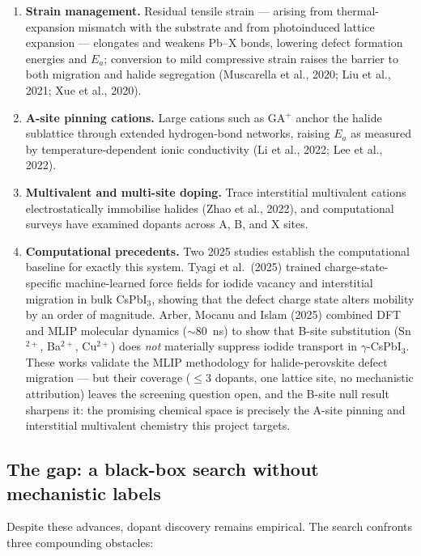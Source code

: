 \documentclass[11pt,a4paper]{article}
\begin{document}
\begin{enumerate}[leftmargin=1.5em]
\item \textbf{Strain management.} Residual tensile strain --- arising from
thermal-expansion mismatch with the substrate and from photoinduced lattice expansion
--- elongates and weakens Pb--X bonds, lowering defect formation energies and $E_a$;
conversion to mild compressive strain raises the barrier to both migration and halide
segregation (Muscarella et al., 2020; Liu et al., 2021; Xue et al., 2020).

\item \textbf{A-site pinning cations.} Large cations such as GA$^+$ anchor the halide
sublattice through extended hydrogen-bond networks, raising $E_a$ as measured by
temperature-dependent ionic conductivity (Li et al., 2022; Lee et al., 2022).

\item \textbf{Multivalent and multi-site doping.} Trace interstitial multivalent
cations electrostatically immobilise halides (Zhao et al., 2022), and computational
surveys have examined dopants across A, B, and X sites.

\item \textbf{Computational precedents.} Two 2025 studies establish the computational
baseline for exactly this system. Tyagi et al.\ (2025) trained charge-state-specific
machine-learned force fields for iodide vacancy and interstitial migration in bulk
CsPbI$_3$, showing that the defect charge state alters mobility by an order of
magnitude. Arber, Mocanu and Islam (2025) combined DFT and MLIP molecular dynamics
($\sim$80~ns) to show that B-site substitution (Sn$^{2+}$, Ba$^{2+}$, Cu$^{2+}$) does
\emph{not} materially suppress iodide transport in $\gamma$-CsPbI$_3$. These works
validate the MLIP methodology for halide-perovskite defect migration --- but their
coverage ($\leq$3 dopants, one lattice site, no mechanistic attribution) leaves the
screening question open, and the B-site null result sharpens it: the promising chemical
space is precisely the A-site pinning and interstitial multivalent chemistry this
project targets.
\end{enumerate}

\subsection{The gap: a black-box search without mechanistic labels}
Despite these advances, dopant discovery remains empirical. The search confronts three
compounding obstacles:
\end{document}
